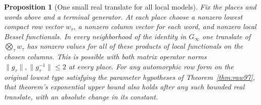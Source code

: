 \documentclass[a4paper,11pt]{article}
\newtheorem{proposition}{Proposition}[section]
\theoremstyle{definition}
\theoremstyle{remark}
\numberwithin{equation}{section}
\begin{document}
\begin{proposition}[One small real translate for all local models]\label{prop:translate109}
Fix the places and words above and a terminal generator. At each
place choose a nonzero lowest compact row vector \(w_\tau\), a
nonzero column vector for each word, and nonzero local Bessel
functionals. In every neighborhood of the identity in \(G_\infty\)
one translate of \(\bigotimes_\tau w_\tau\) has nonzero values
for all of these products of local functionals on the chosen
columns. This is possible with both matrix operator norms
\(\|g_\tau\|,\|g_\tau^{-1}\|\le2\) at every place. For any
automorphic row form on the original lowest type satisfying the
parameter hypotheses of Theorem~\ref{thm:raw97}, that theorem's
exponential upper bound also holds after any such bounded real
translate, with an absolute change in its constant.
\end{proposition}
\end{document}
